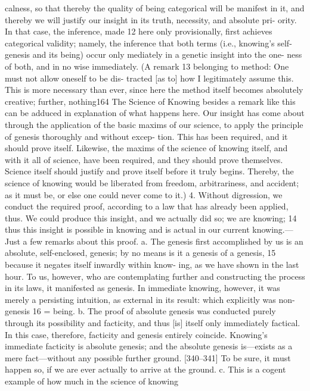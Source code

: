 calness, so that thereby the quality of being categorical will be manifest in it,
and thereby we will justify our insight in its truth, necessity, and absolute pri-
ority. In that case, the inference, made 12 here only provisionally, first achieves
categorical validity; namely, the inference that both terms (i.e., knowing’s self-
genesis and its being) occur only mediately in a genetic insight into the one-
ness of both, and in no wise immediately.
(A remark 13 belonging to method: One must not allow oneself to be dis-
tracted [as to] how I legitimately assume this. This is more necessary than
ever, since here the method itself becomes absolutely creative; further, nothing164
The Science of Knowing
besides a remark like this can be adduced in explanation of what happens here.
Our insight has come about through the application of the basic maxims of
our science, to apply the principle of genesis thoroughly and without excep-
tion. This has been required, and it should prove itself. Likewise, the maxims
of the science of knowing itself, and with it all of science, have been required,
and they should prove themselves. Science itself should justify and prove itself
before it truly begins. Thereby, the science of knowing would be liberated
from freedom, arbitrariness, and accident; as it must be, or else one could
never come to it.)
4. Without digression, we conduct the required proof, according to a law
that has already been applied, thus. We could produce this insight, and we
actually did so; we are knowing; 14 thus this insight is possible in knowing and
is actual in our current knowing.—Just a few remarks about this proof. a. The
genesis first accomplished by us is an absolute, self-enclosed, genesis; by no
means is it a genesis of a genesis, 15 because it negates itself inwardly within know-
ing, as we have shown in the last hour. To us, however, who are contemplating
further and constructing the process in its laws, it manifested as genesis. In
immediate knowing, however, it was merely a persisting intuition, as external
in its result: which explicitly was non-genesis 16 = being. b. The proof of absolute
genesis was conducted purely through its possibility and facticity, and thus [is]
itself only immediately factical. In this case, therefore, facticity and genesis
entirely coincide. Knowing’s immediate facticity is absolute genesis; and the
absolute genesis is—exists as a mere fact—without any possible further ground.
[340–341] To be sure, it must happen so, if we are ever actually to arrive at the
ground. c. This is a cogent example of how much in the science of knowing
